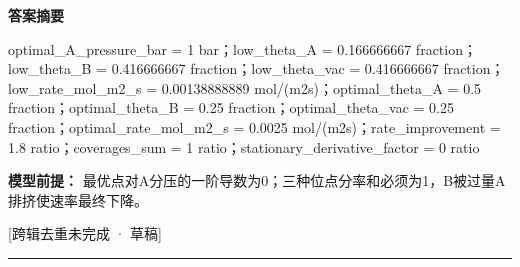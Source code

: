 \documentclass[UTF8,11pt,a4paper]{ctexart}
\begin{document}
\noindent\textbf{答案摘要}\par
optimal\_A\_pressure\_bar = 1 bar；low\_theta\_A = 0.166666667 fraction；low\_theta\_B = 0.416666667 fraction；low\_theta\_vac = 0.416666667 fraction；low\_rate\_mol\_m2\_s = 0.00138888889 mol/(m2s)；optimal\_theta\_A = 0.5 fraction；optimal\_theta\_B = 0.25 fraction；optimal\_theta\_vac = 0.25 fraction；optimal\_rate\_mol\_m2\_s = 0.0025 mol/(m2s)；rate\_improvement = 1.8 ratio；coverages\_sum = 1 ratio；stationary\_derivative\_factor = 0 ratio\par
\noindent\textbf{模型前提：}
最优点对A分压的一阶导数为0；三种位点分率和必须为1，B被过量A排挤使速率最终下降。\par
\noindent\textcolor{red!65!black}{[跨辑去重未完成 · 草稿]} \par
\medskip\hrule\medskip
\end{document}
